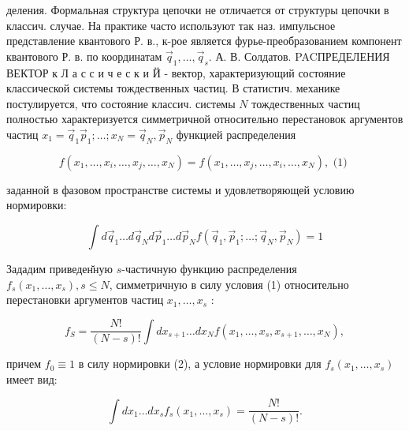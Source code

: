 \documentclass[10pt]{article}
\begin{document}
деления. Формальная структура цепочки не отличается от структуры цепочки в классич. случае. На практике часто используют так наз. импульсное представление квантового Р. в., к-рое является фурье-преобразованием компонент квантового Р. в. по координатам $\vec{q}_{1}, \ldots, \vec{q}_{s}$. А. В. Солдатов. PACПРЕДЕЛЕНИЯ ВЕКТОР к Л а с с и ч е с к и Й - вектор, характеризующий состояние классической системы тождественных частиц. В статистич. механике постулируется, что состояние классич. системы $N$ тождественных частиц полностью характеризуется симметричной относительно перестановок аргументов частиц $x_{1}=\vec{q}_{1} \vec{p}_{1} ; \ldots ; x_{N}=\vec{q}_{N}, \vec{p}_{N}$ функцией распределения



\[

f\left(x_{1}, \ldots, x_{i}, \ldots, x_{j}, \ldots, x_{N}\right)=f\left(x_{1}, \ldots, x_{j}, \ldots, x_{i}, \ldots, x_{N}\right), \text { (1) }

\]



заданной в фазовом пространстве системы и удовлетворяющей условию нормировки:



\[

\int d \vec{q}_{1} \ldots d \vec{q}_{N} d \vec{p}_{1} \ldots d \vec{p}_{N} f\left(\vec{q}_{1}, \vec{p}_{1} ; \ldots ; \vec{q}_{N}, \vec{p}_{N}\right)=1

\]



Зададим приведен̆ную $s$-частичную функцию распределения $f_{s}\left(x_{1}, \ldots, x_{s}\right), s \leqslant N$, симметричную в силу условия (1) относительно перестановки аргументов частиц $x_{1}, \ldots, x_{s}$ :



\[

f_{S}=\frac{N !}{(N-s) !} \int d x_{s+1} \ldots d x_{N} f\left(x_{1}, \ldots, x_{s}, x_{s+1}, \ldots, x_{N}\right),

\]



причем $f_{0} \equiv 1$ в силу нормировки (2), а условие нормировки для $f_{s}\left(x_{1}, \ldots, x_{s}\right)$ имеет вид:



\[

\int d x_{1} \ldots d x_{s} f_{s}\left(x_{1}, \ldots, x_{s}\right)=\frac{N !}{(N-s) !} .

\]
\end{document}
